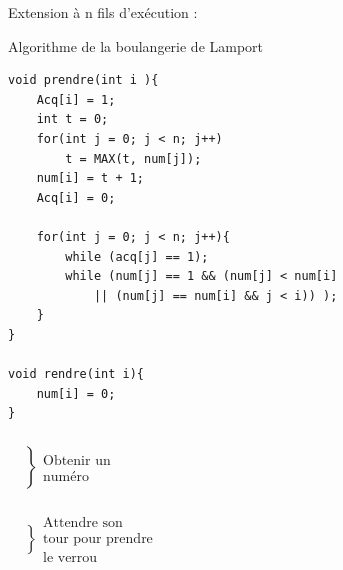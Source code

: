 Extension à n fils d'exécution :
\begin{algo} \normalfont Algorithme de la boulangerie de Lamport\\
\begin{minipage}{0.6\linewidth}
	\begin{lstlisting}[style=CStyle]   
void prendre(int i ){
	Acq[i] = 1;
	int t = 0;
	for(int j = 0; j < n; j++)
		t = MAX(t, num[j]);
	num[i] = t + 1;
	Acq[i] = 0;
	
	for(int j = 0; j < n; j++){
		while (acq[j] == 1);
		while (num[j] == 1 && (num[j] < num[i] 
			|| (num[j] == num[i] && j < i)) );
	}
}

void rendre(int i){
	num[i] = 0;
}\end{lstlisting}
\end{minipage}
\begin{minipage}{0.25\linewidth}
	$\begin{array}{l}
	\left. \begin{array}{c} \\ \\ \\ \\ \\ \end{array} \right\} \begin{array}{c} \\ \\ \text{Obtenir un} \\\text{numéro} \\ \\ \end{array} \\
	\\
	\left. \begin{array}{c} \\ \\ \\ \\ \end{array} \right\} \begin{array}{c} \\ \text{Attendre son} \\\text{tour pour prendre} \\ \text{le verrou} \\ \end{array}
	\\ \\ \\ \\ \\
	\end{array}
	$
\end{minipage}
\end{algo}


